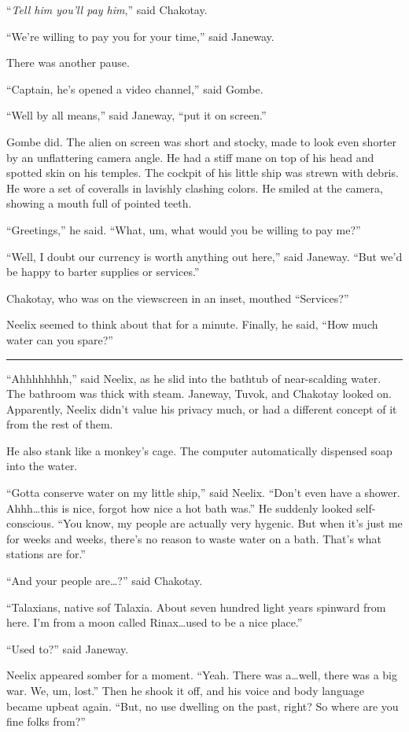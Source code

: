 \documentclass[twoside,letterpaper,12pt]{memoir}
\begin{document}
``\textit{Tell him you'll pay him},'' said Chakotay.

``We're willing to pay you for your time,'' said Janeway.

There was another pause.

``Captain, he's opened a video channel,'' said Gombe.

``Well by all means,'' said Janeway, ``put it on screen.''

Gombe did. The alien on screen was short and stocky, made to look even shorter by an unflattering camera angle. He had a stiff mane on top of his head and spotted skin on his temples. The cockpit of his little ship was strewn with debris. He wore a set of coveralls in lavishly clashing colors. He smiled at the camera, showing a mouth full of pointed teeth.

``Greetings,'' he said. ``What, um, what would you be willing to pay me?''

``Well, I doubt our currency is worth anything out here,'' said Janeway. ``But we'd be happy to barter supplies or services.''

Chakotay, who was on the viewscreen in an inset, mouthed ``Services?''

Neelix seemed to think about that for a minute. Finally, he said, ``How much water can you spare?''

\fancybreak{\rule{3cm}{0.4 pt}}
``Ahhhhhhhh,'' said Neelix, as he slid into the bathtub of near-scalding water. The bathroom was thick with steam. Janeway, Tuvok, and Chakotay looked on. Apparently, Neelix didn't value his privacy much, or had a different concept of it from the rest of them.

He also stank like a monkey's cage. The computer automatically dispensed soap into the water.

``Gotta conserve water on my little ship,'' said Neelix. ``Don't even have a shower. Ahhh\ldots this is nice, forgot how nice a hot bath was.'' He suddenly looked self-conscious. ``You know, my people are actually very hygenic. But when it's just me for weeks and weeks, there's no reason to waste water on a bath. That's what stations are for.''

``And your people are\ldots ?'' said Chakotay.

``Talaxians, native sof Talaxia. About seven hundred light years spinward from here. I'm from a moon called Rinax\ldots used to be a nice place.''

``Used to?'' said Janeway.

Neelix appeared somber for a moment. ``Yeah. There was a\ldots well, there was a big war. We, um, lost.'' Then he shook it off, and his voice and body language became upbeat again. ``But, no use dwelling on the past, right? So where are you fine folks from?''
\end{document}
